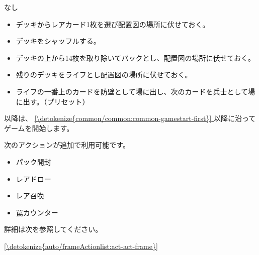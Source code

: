 \documentclass[letterpaper,10pt,dvipdfmx]{sphinxmanual}
\begin{document}
\sphinxAtStartPar
{}

\sphinxAtStartPar
なし

\sphinxAtStartPar
{}
\begin{itemize}
\item {} 
\sphinxAtStartPar
デッキからレアカード1枚を選び配置図の場所に伏せておく。

\item {} 
\sphinxAtStartPar
デッキをシャッフルする。

\item {} 
\sphinxAtStartPar
デッキの上から14枚を取り除いてパックとし、配置図の場所に伏せておく。

\item {} 
\sphinxAtStartPar
残りのデッキをライフとし配置図の場所に伏せておく。

\item {} 
\sphinxAtStartPar
ライフの一番上のカードを防壁として場に出し、次のカードを兵士として場に出す。（プリセット）

\end{itemize}

\sphinxAtStartPar
以降は、 \hyperref[\detokenize{common/common:common-gamestart-first}]{\ref{\detokenize{common/common:common-gamestart-first}} } 以降に沿ってゲームを開始します。

\sphinxAtStartPar
{}

\sphinxAtStartPar
次のアクションが追加で利用可能です。
\begin{itemize}
\item {} 
\sphinxAtStartPar
パック開封

\item {} 
\sphinxAtStartPar
レアドロー

\item {} 
\sphinxAtStartPar
レア召喚

\item {} 
\sphinxAtStartPar
罠カウンター

\end{itemize}

\sphinxAtStartPar
詳細は次を参照してください。

\sphinxAtStartPar
\hyperref[\detokenize{auto/frameActionlist:act-act-frame}]{\ref{\detokenize{auto/frameActionlist:act-act-frame}} }

\sphinxAtStartPar
{}
\end{document}
